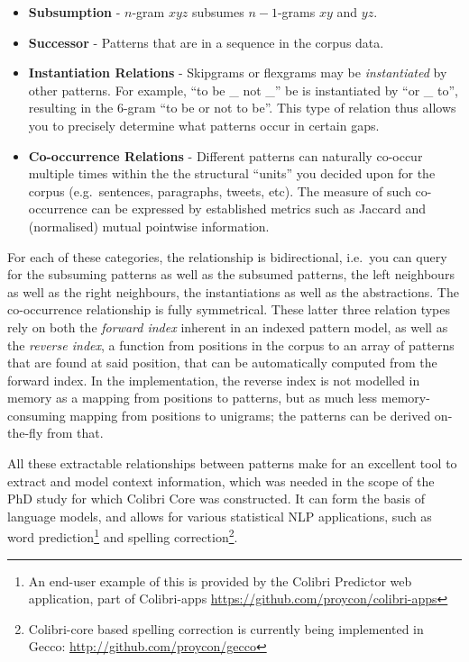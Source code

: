 \begin{itemize}
 \item \textbf{Subsumption} - $n$-gram $x y z$ subsumes $n-1$-grams $x y$ and $y z$. 
 \item \textbf{Successor} - Patterns that are in a sequence in the corpus data. 
 \item \textbf{Instantiation Relations} - Skipgrams or flexgrams may be
     \emph{instantiated} by other patterns. For example, ``to be \_ not \_'' be
     is instantiated by ``or \_ to'', resulting in the 6-gram ``to be or not to be''. This type of relation thus allows you to precisely determine what patterns occur in certain gaps.
 \item \textbf{Co-occurrence Relations} - Different patterns can naturally co-occur multiple times
     within the the structural ``units'' you decided upon for the corpus (e.g.\ 
     sentences, paragraphs, tweets, etc). The measure of such co-occurrence 
     can be expressed by established metrics such as Jaccard and (normalised) mutual
     pointwise information.
\end{itemize}

For each of these categories, the relationship is bidirectional, i.e.\ you can
query for the subsuming patterns as well as the subsumed patterns, the left
neighbours as well as the right neighbours, the instantiations as well as the
abstractions. The co-occurrence relationship is fully symmetrical. These latter
three relation types rely on both the \emph{forward index} inherent in an
indexed pattern model, as well as the \emph{reverse index}, a function from
positions in the corpus to an array of patterns that are found at said
position, that can be automatically computed from the forward index. In the
implementation, the reverse index is not modelled in memory as a mapping from
positions to patterns, but as much less memory-consuming mapping from positions
to unigrams; the patterns can be derived on-the-fly from that.

All these extractable relationships between patterns make for an excellent tool
to extract and model context information, which was needed in the scope of the
PhD study for which Colibri Core was constructed. It can form the basis of
language models, and allows for various statistical NLP applications, such as
word prediction\footnote{An end-user example of this is provided by the Colibri
Predictor web application, part of Colibri-apps
\url{https://github.com/proycon/colibri-apps}} and spelling correction\footnote{Colibri-core based spelling correction is currently being implemented
in Gecco: \url{http://github.com/proycon/gecco}}. 

